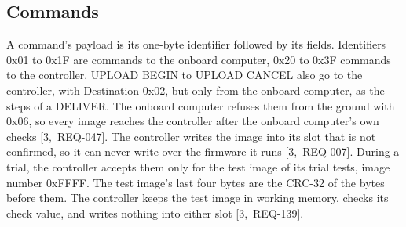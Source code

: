 \documentclass[11pt,a4paper]{article}
\begin{document}
\subsection{Commands}
\label{sec:commands}
A command's payload is its one-byte identifier followed by its fields.
Identifiers 0x01 to 0x1F are commands to the onboard computer, 0x20 to 0x3F
commands to the controller. UPLOAD BEGIN to UPLOAD CANCEL also go to the
controller, with Destination 0x02, but only from the onboard computer, as the
steps of a DELIVER. The onboard computer refuses them from the ground with
0x06, so every image reaches the controller after the onboard computer's own
checks \mbox{[3,~REQ-047]}. The controller writes the image into its slot that
is not confirmed, so it can never write over the firmware it runs
\mbox{[3,~REQ-007]}. During a trial, the controller accepts them only for the
test image of its trial tests, image number 0xFFFF. The test image's last four
bytes are the CRC-32 of the bytes before them. The controller keeps the test
image in working memory, checks its check value, and writes nothing into
either slot \mbox{[3,~REQ-139]}.
\end{document}
